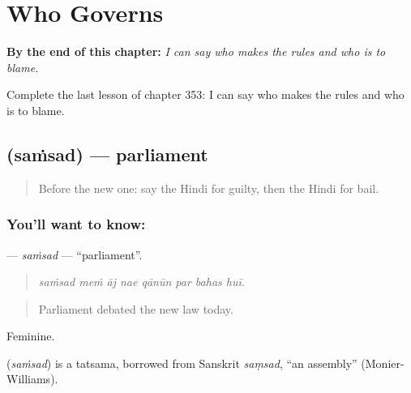
\chapter{Who Governs}
\label{ch:hi-who-governs}

\begin{chapteropening}
\textbf{By the end of this chapter:} \emph{I can say who makes the rules and who is to blame.}

Complete the last lesson of chapter 353: I can say who makes the rules and who is to blame.
\end{chapteropening}

\section[\texorpdfstring{\hi{संसद} (saṁsad)}{संसद (saṁsad)}]{ (saṁsad) — parliament}

\label{lesson:HI-C353-samsad}



\begin{quote}
Before the new one: say the Hindi for guilty, then the Hindi for bail.
\end{quote}

\subsection*{You'll want to know: }
\textbf{} — \emph{saṁsad} — \textquotedblleft{}parliament\textquotedblright{}.

\begin{quote}
       
\end{quote}

\begin{quote}
\emph{saṁsad meṁ āj nae qānūn par bahas huī.}
\end{quote}

\begin{quote}
Parliament debated the new law today.
\end{quote}

Feminine.

\begin{cousinweb}
\textbf{} (\emph{saṁsad}) is a tatsama, borrowed from Sanskrit \emph{saṃsad}, \textquotedblleft{}an assembly\textquotedblright{} (Monier-Williams).
\end{cousinweb}

